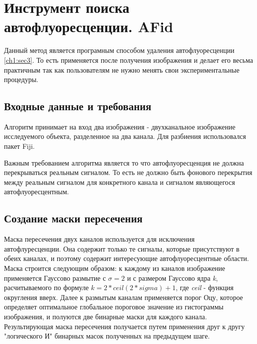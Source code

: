 

	


	
\section{Инструмент поиска автофлуоресценции. AFid} \label{ch2:sec-abbr} %
Данный метод является програмным способом удаления автофлуоресценции \ref{ch1:sec3}. То есть применяется после получения изображения и делает его весьма практичным  так как пользователям не нужно менять свои экспериментальные процедуры.\cite{Conference}	
	
\subsection{Входные данные и требования} \label{ch2:subsec-title-abbr} %
Алгоритм принимает на вход два изображения - двухканальное изображение исследуемого объекта, разделенное на два канала. Для разбиения использовался пакет Fiji. \cite{Techreport}
 
Важным требованием алгоритма является то что автофлуоресценция не должна перекрываться реальным сигналом. То есть не должно быть фонового перекрытия между реальным сигналом для конкретного канала и сигналом являющегося автофлуоресцентным.\cite{Conference}

\subsection{Создание маски пересечения}
Маска пересечения двух каналов используется для исключения автофлуресценции. Она содержит только те сигналы, которые присутствуют в обеих каналах, и поэтому содержит интересующие автофлуоресцентные области. Маска строится следующим образом: к каждому из каналов изображение применяется Гауссово размытие с $\sigma = 2$ и с размером Гауссово ядра \textit{k}, расчитываемого по формуле $ k =  2 * ceil(2 * sigma) + 1$, где \textit{ceil} - функция округления вверх. Далее к размытым каналам применяется порог Оцу, которое определяет оптимальное глобальное пороговое значение из гистограммы изображения, и полуются две бинарные маски для каждого канала. Результирующая маска пересечения получается путем применения друг к другу "логического И"     бинарных масок полученных на предыдущем шаге. \cite{Conference}

